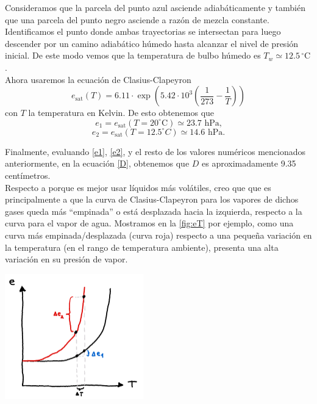 \documentclass[../main.tex]{subfiles}
\begin{document}
Consideramos que la parcela del punto azul asciende adiabáticamente y también que una parcela del punto negro asciende a razón de mezcla constante. Identificamos el punto donde ambas trayectorias se intersectan para luego descender por un camino adiabático húmedo hasta alcanzar el nivel de presión inicial. De este modo vemos que la temperatura de bulbo húmedo es $T_w \simeq 12.5\,^{\circ}\text{C}$.\\

Ahora usaremos la ecuación de Clasius-Clapeyron
\begin{equation}
   e_\text{sat}(T) = 6.11 \cdot \exp \left(   5.42\cdot 10^3 \left( \frac{1}{273} - \frac{1}{T} \right) \right)
\end{equation}
con $T$ la temperatura en Kelvin. De esto obtenemos que 
 \begin{equation}
     e_1 = e_\text{sat}(T = 20^{\circ}\text{C}) \simeq 23.7 \text{ hPa,} \label{e1}
 \end{equation}
\begin{equation}
    e_2 = e_\text{sat}(T = 12.5^{\circ}C) \simeq 14.6 \text{ hPa.} \label{e2}
\end{equation}

Finalmente, evaluando \eqref{e1}, \eqref{e2}, y el resto de los valores numéricos mencionados anteriormente, en la ecuación \eqref{D}, obtenemos que $D$ es aproximadamente 9.35 centímetros.\\

Respecto a porque es mejor usar líquidos más volátiles, creo que que es principalmente a que la curva de Clasius-Clapeyron para los vapores de dichos gases queda más ``empinada'' o está desplazada hacia la izquierda, respecto a la curva para el vapor de agua. Mostramos en la \autoref{fig:eT} por ejemplo, como una curva más empinada/desplazada (curva roja) respecto a una pequeña variación en la temperatura (en el rango de temperatura ambiente), presenta una alta variación en su presión de vapor. \\

\begin{minipage}{\linewidth}
    \centering
    \includegraphics[width=0.45\textwidth]{img/eT}
    \label{fig:eT}
\end{minipage}
\end{document}
